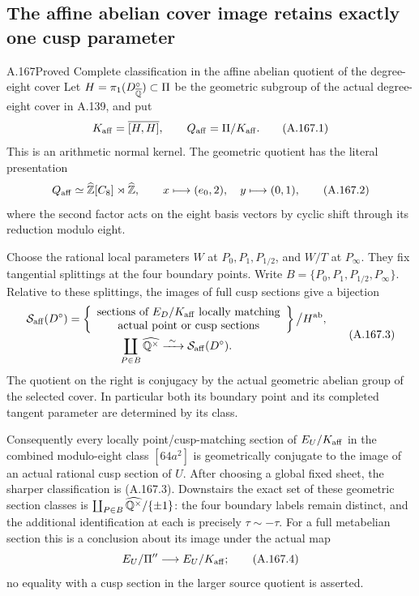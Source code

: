\subsection{The affine abelian cover image retains exactly one cusp parameter}

\begin{statement}{A.167}{Proved}
{Complete classification in the affine abelian quotient of the degree-eight cover}
Let \(H=\pi_1(D^\circ_{\overline{\mathbb Q}})\subset\Pi\) be the
geometric subgroup of the actual degree-eight cover in A.139, and put
\[
 K_{\rm aff}=\overline{[H,H]},\qquad
 Q_{\rm aff}=\Pi/K_{\rm aff}.
\tag{A.167.1}
\]
This is an arithmetic normal kernel.  The geometric quotient has the
literal presentation
\[
 Q_{\rm aff}\simeq\widehat{\mathbb Z}[C_8]\rtimes\widehat{\mathbb Z},
 \qquad x\longmapsto(e_0,2),\quad y\longmapsto(0,1),
\tag{A.167.2}
\]
where the second factor acts on the eight basis vectors by cyclic shift
through its reduction modulo eight.

Choose the rational local parameters \(W\) at
\(P_0,P_1,P_{1/2}\), and \(W/T\) at \(P_\infty\).
They fix tangential splittings at the four boundary points.  Write
\(B=\{P_0,P_1,P_{1/2},P_\infty\}\).  Relative
to these splittings, the images of full cusp sections give a bijection
\[
 \begin{gathered}
 \mathcal S_{\rm aff}(D^\circ)=
 \left\{\begin{array}{c}
 \text{sections of }E_D/K_{\rm aff}\text{ locally matching}\\
 \text{actual point or cusp sections}
 \end{array}\right\}\big/H^{\rm ab},\\
 \coprod_{P\in B}\widehat{\mathbb Q^\times}
           \xrightarrow{\ \sim\ }\mathcal S_{\rm aff}(D^\circ).
 \end{gathered}
\tag{A.167.3}
\]
The quotient on the right is conjugacy by the actual geometric
abelian group of the selected cover.  In particular both its boundary
point and its completed tangent parameter are determined by its class.

Consequently every locally point/cusp-matching section of
\(E_U/K_{\rm aff}\) in the combined modulo-eight class
\([64a^2]\) is geometrically conjugate to the image of an actual
rational cusp section of \(U\).  After choosing a global fixed sheet,
the sharper classification is (A.167.3).  Downstairs the exact set of
these geometric section classes is
\(\coprod_{P\in B}\widehat{\mathbb Q^\times}/\{\pm1\}\):
the four boundary labels remain distinct, and the additional
identification at each is precisely \(\tau\sim-\tau\).
For a full metabelian section
this is a conclusion about its image under the actual map
\[
             E_U/\Pi''\longrightarrow E_U/K_{\rm aff};
\tag{A.167.4}
\]
no equality with a cusp section in the larger source quotient is
asserted.
\end{statement}

